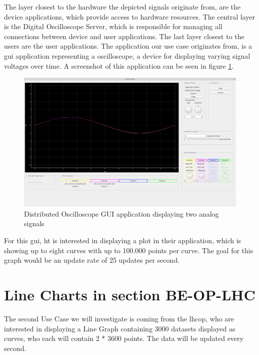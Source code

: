 The layer closest to the hardware the depicted signals originate from, are the
device applications, which provide access to hardware resources. The central
layer is the Digital Oscilloscope Server, which is responsible for managing all
connections between device and user applications. The last layer closest to the
users are the user applications. The application our use case originates from,
is a \gls{gui} application representing a oscilloscope, a device for displaying
varying signal voltages over time. A screenshot of this application can be seen
in figure \ref{fig:dogui}.
\cite{DistrOscDocs, BeCoHtSection}

\begin{figure}[h]
    \centering
    \includegraphics[width=15cm]{resources/img/DistributedOscilloscope}
    \caption{
        Distributed Oscilloscope GUI application displaying two analog signals
    }
    \label{fig:dogui}
\end{figure}

For this \gls{gui}, \gls{ht} is interested in displaying a plot in their
application, which is showing up to eight curves with up to 100.000 points per
curve. The goal for this graph would be an update rate of 25 updates per second.


\section{Line Charts in section BE-OP-LHC}
\label{sec:usecases:becolhc}

The second Use Case we will investigate is coming from the \gls{lhcop}, who are
interested in displaying a Line Graph containing 3000 datasets displayed as
curves, who each will contain 2 * 3600 points. The data will be updated every
second.


